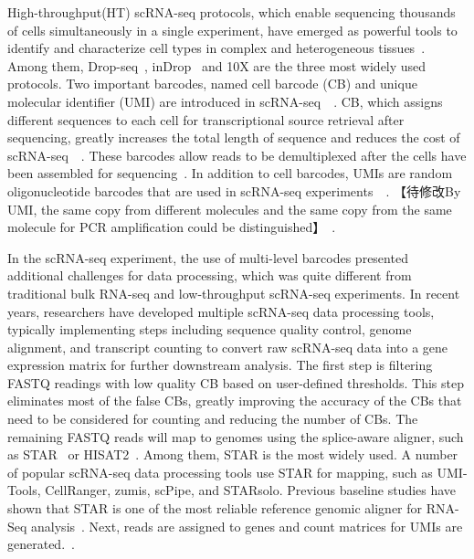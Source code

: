 \documentclass[conference]{IEEEtran}
\begin{document}
High-throughput(HT) scRNA-seq protocols, which enable sequencing thousands of cells simultaneously in a single experiment, have emerged as powerful tools to identify and characterize cell types in complex and heterogeneous tissues~\cite{Zhang2019ComparativeAO}.
Among them, Drop-seq~\cite{Macosko2015HighlyPG}, inDrop~\cite{Klein2015DropletBF} and 10X\cite{Zheng2017Massively} are the three most widely used protocols. 
Two important barcodes, named cell barcode (CB) and unique molecular identifier (UMI) are introduced in scRNA-seq~\cite{Rosenberg2018SinglecellPO}~\cite{Cao2017ComprehensiveSC}. 
CB, which assigns different sequences to each cell for transcriptional source retrieval after sequencing, greatly increases the total length of sequence and reduces the cost of scRNA-seq~\cite{Macosko2015HighlyPG}~\cite{Klein2015DropletBF}. 
These barcodes allow reads to be demultiplexed after the cells have been assembled for sequencing~\cite{Tian2018scPipe}.
In addition to cell barcodes, UMIs are random oligonucleotide barcodes that are used in scRNA-seq experiments~\cite{Kivioja2012Counting}~\cite{Camara2017Methods}.
【待修改By UMI, the same copy from different molecules and the same copy from the same molecule for PCR amplification could be distinguished】~\cite{Smith2017UMItools}.

In the scRNA-seq experiment, the use of multi-level barcodes presented additional challenges for data processing, which was quite different from traditional bulk RNA-seq and low-throughput scRNA-seq experiments. 
In recent years, researchers have developed multiple scRNA-seq data processing tools, typically implementing steps including sequence quality control, genome alignment, and transcript counting to convert raw scRNA-seq data into a gene expression matrix for further downstream analysis. 
The first step is filtering FASTQ readings with low quality CB based on user-defined thresholds. 
This step eliminates most of the false CBs, greatly improving the accuracy of the CBs that need to be considered for counting and reducing the number of CBs. 
The remaining FASTQ reads will map to genomes using the splice-aware aligner, such as STAR~\cite{Dobin2013STAR} or HISAT2~\cite{Kim2015HISAT}. 
Among them, STAR is the most widely used. A number of popular scRNA-seq data processing tools use STAR for mapping, such as UMI-Tools, CellRanger, zumis, scPipe, and STARsolo. 
Previous baseline studies have shown that STAR is one of the most reliable reference genomic aligner for RNA-Seq analysis~\cite{Baruzzo2017SimulationbasedCB}. 
Next, reads are assigned to genes and count matrices for UMIs are generated.~\cite{Parekh2018zUMIs}. 
\end{document}
